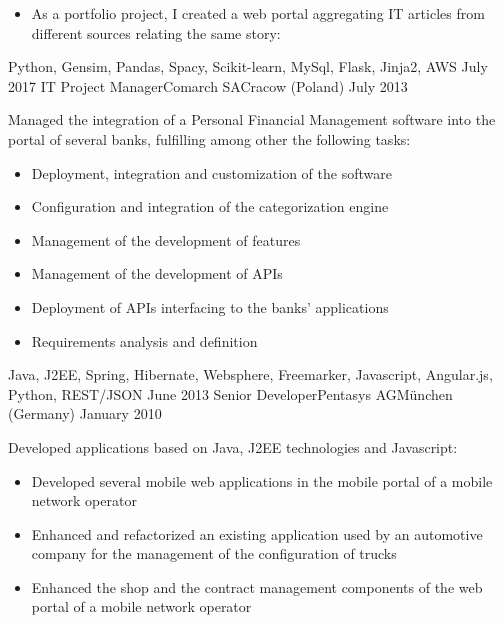 \begin{experiences}
{\begin{itemize}
					   \item As a portfolio project, I created a web portal aggregating IT articles from different sources relating the same story: 
                      \end{itemize}
                    }
                    {Python, Gensim, Pandas, Spacy, Scikit-learn, MySql, Flask, Jinja2, AWS}
  \emptySeparator
  \experience
    {July 2017} {IT Project Manager}{Comarch SA}{Cracow (Poland)}
    {July 2013} {Managed the integration of a Personal Financial Management software into the portal of several banks, fulfilling among other the following tasks:
       			 \begin{itemize}
                        \item Deployment, integration and customization of the software
                        \item Configuration and integration of the categorization engine                        
                        \item Management of the development of features 
                        \item Management of the development of APIs
                        \item Deployment of APIs interfacing to the banks' applications 
                        \item Requirements analysis and definition                                                
                      \end{itemize}
                    }
                    {Java, J2EE, Spring, Hibernate, Websphere, Freemarker, Javascript, Angular.js, Python, REST/JSON}
  \emptySeparator
  \experience
    {June 2013}    {Senior Developer}{Pentasys AG}{München (Germany)}
    {January 2010} {Developed applications based on Java, J2EE technologies and Javascript:   
                      \begin{itemize}
                        \item Developed several mobile web applications in the mobile portal of a mobile network operator
                        \item Enhanced and refactorized an existing application used by an automotive company for the management of the configuration of trucks                 
                        \item Enhanced the shop and the contract management components of the web portal of a mobile network operator
                      \end{itemize}
}
\end{experiences}
